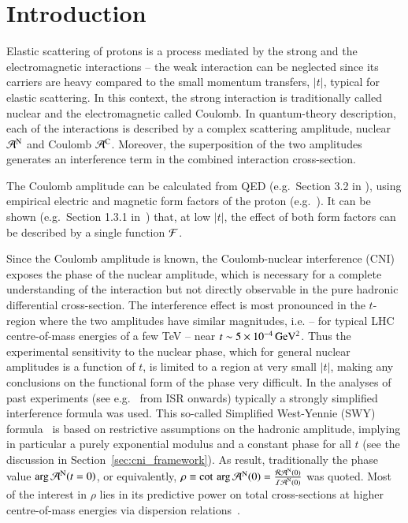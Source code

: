 \section{Introduction}
%
Elastic scattering of protons is a process mediated by the strong and the electromagnetic interactions -- the weak interaction can be neglected since its carriers are heavy compared to the small momentum transfers, $|t|$, typical for elastic scattering. In this context, the strong interaction is traditionally called nuclear and the electromagnetic called Coulomb. In quantum-theory description, each of the interactions is described by a complex scattering amplitude, nuclear ${\cal A}^{\rm N}$ and Coulomb ${\cal A}^{\rm C}$. Moreover, the superposition 
of the two amplitudes generates an interference term in the combined interaction cross-section. 

The Coulomb amplitude can be calculated from QED (e.g.~Section 3.2 in \cite{block06}), using empirical electric and magnetic form factors of the proton (e.g.~\cite{puckett10}). It can be shown (e.g.~Section 1.3.1 in~\cite{jan_thesis}) that, at low $|t|$, the effect of both form factors can be described by a single function ${\cal F}$. 

Since the Coulomb amplitude is known, the Coulomb-nuclear interference (CNI) exposes the phase of the nuclear amplitude, which is necessary for a complete understanding of the interaction but not directly observable in the pure hadronic differential cross-section. The interference effect is most pronounced in the $t$-region where the two amplitudes have similar magnitudes, i.e. -- for typical LHC centre-of-mass energies of a few TeV -- near $t \sim 5 \times 10^{-4}\,\rm GeV^{2}$. Thus the experimental sensitivity to 
the nuclear phase, which for general nuclear amplitudes is a function of $t$, 
is limited to a region at very small $|t|$, making any conclusions on the 
functional form of the phase very difficult.
In the analyses of past experiments (see e.g.~\cite{} from ISR onwards) 
typically a strongly simplified interference formula was used. This so-called
Simplified West-Yennie (SWY) formula~\cite{wy68} is based on restrictive assumptions on the 
hadronic amplitude, implying in particular a purely exponential modulus and a 
constant phase for all $t$ (see the discussion in 
Section~\ref{sec:cni_framework}).
As result, traditionally the phase value $\arg {\cal A}^{\rm N} (t=0)$, or
equivalently, $\rho \equiv \cot \, \arg {\cal A}^{\rm N} (0) = \frac{{\cal R A}^{\rm N} (0)}{{\cal I A}^{\rm N} (0)}$ was quoted. 
Most of the interest in $\rho$ lies in its predictive power on total cross-sections at higher centre-of-mass energies via dispersion 
relations~\cite{dremin-dispersion}. 


